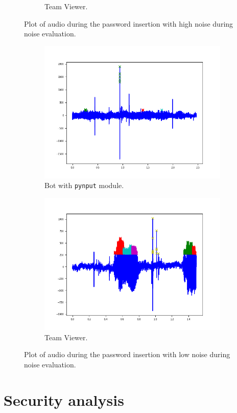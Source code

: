 \begin{figure}[h]
\begin{subfigure}[b]{0.48\textwidth}
         \caption{\footnotesize{Team Viewer.}}
     \end{subfigure}
     \caption{\footnotesize{Plot of audio during the password insertion with high noise during noise evaluation.}}\label{AcCAPPCHA:silence_img}
\end{figure}
\begin{figure}[h]
     \centering
	 \begin{subfigure}[b]{0.48\textwidth}
         \centering
         \includegraphics[width=\linewidth]{Images/Results/Bot/noise}
         \caption{\footnotesize{Bot with \texttt{pynput} module.}}
     \end{subfigure}
	 \hfill     
     \begin{subfigure}[b]{0.48\textwidth}
         \centering
         \includegraphics[width=\linewidth]{Images/Results/TeamViewer/noise}
         \caption{\footnotesize{Team Viewer.}}
     \end{subfigure}
     \caption{\footnotesize{Plot of audio during the password insertion with low noise during noise evaluation.}}\label{AcCAPPCHA:noise_img}
\end{figure}

\section{Security analysis}
